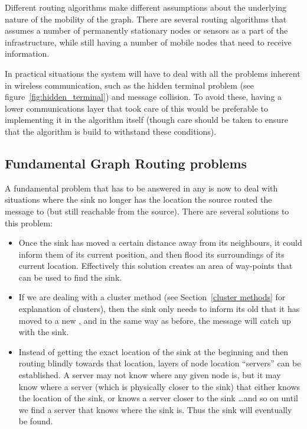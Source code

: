 \documentclass[letter, 12pt, english, draft]{article}
\begin{document}
Different routing algorithms make different assumptions about the underlying nature of the mobility of the graph. There are several routing algorithms \cite{adaptive, two-tier} that assumes a number of permanently stationary nodes or sensors as a part of the infrastructure, while still having a number of mobile nodes that need to receive information. 


In practical situations the system will have to deal with all the problems inherent in wireless communication, such as the hidden terminal problem (see figure~\ref{fig:hidden_terminal}) and message collision. To avoid these, having a lower communications layer that took care of this would be preferable to implementing it in the algorithm itself (though care should be taken to ensure that the algorithm is build to withstand these conditions).

\subsection{Fundamental Graph Routing problems}

A fundamental problem that has to be answered in any \manet is now to deal with situations where the sink no longer has the location the source routed the message to (but still reachable from the source). There are several solutions to this problem:

\begin{itemize}
\item Once the sink has moved a certain distance away from its neighbours, it could inform them of its current position, and then flood its surroundings of its current location. Effectively this solution creates an area of way-points that can be used to find the sink.
\item If we are dealing with a cluster method (see Section~\ref{cluster methods} for explanation of clusters), then the sink only needs to inform its old \ch that it has moved to a new \ch, and in the same way as before, the message will catch up with the sink.
\item Instead of getting the exact location of the sink at the beginning and then routing blindly towards that location, layers of node location ``servers'' can be established. A server may not know where any given node is, but it may know where a server (which is physically closer to the sink) that either knows the location of the sink, or knows a server closer to the sink \ldots and so on until we find a server that knows where the sink is. Thus the sink will eventually be found.
\end{itemize}
\end{document}
